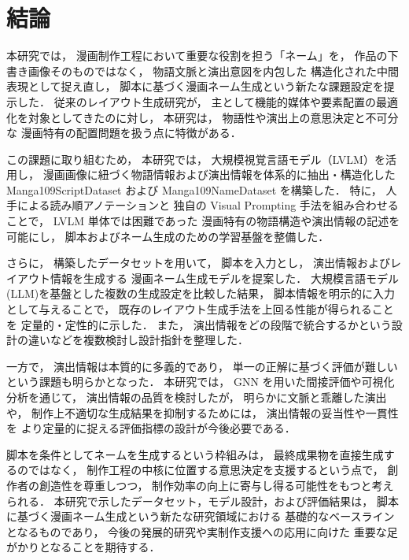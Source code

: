 \documentclass[a4j,12pt,dvipdfmx]{jsreport}
\begin{document}
\ifdefined\ismain\else
   \pagestyle{fancy}
   \lhead{\rightmark}
   \renewcommand{\chaptermark}[1]{\markboth{第\ \thechapter\ 章\ #1}{}}
   \setlength{\headheight}{16.5pt}
   \titleformat{\chapter}[hang]{\LARGE\bfseries}{\prechaptername\thechapter\postchaptername}{1em}{}
\fi

\chapter{結論}\label{chap:conclusion}

本研究では，
漫画制作工程において重要な役割を担う「ネーム」を，
作品の下書き画像そのものではなく，
物語文脈と演出意図を内包した
構造化された中間表現として捉え直し，
脚本に基づく漫画ネーム生成という新たな課題設定を提示した．
従来のレイアウト生成研究が，
主として機能的媒体や要素配置の最適化を対象としてきたのに対し，
本研究は，
物語性や演出上の意思決定と不可分な
漫画特有の配置問題を扱う点に特徴がある．

この課題に取り組むため，
本研究では，
大規模視覚言語モデル（LVLM）を活用し，
漫画画像に紐づく物語情報および演出情報を体系的に抽出・構造化した
Manga109ScriptDataset および Manga109NameDataset を構築した．
特に，
人手による読み順アノテーションと
独自の Visual Prompting 手法を組み合わせることで，
LVLM 単体では困難であった
漫画特有の物語構造や演出情報の記述を可能にし，
脚本およびネーム生成のための学習基盤を整備した．

さらに，
構築したデータセットを用いて，
脚本を入力とし，
演出情報およびレイアウト情報を生成する
漫画ネーム生成モデルを提案した．
大規模言語モデル(LLM)を基盤とした複数の生成設定を比較した結果，
脚本情報を明示的に入力として与えることで，
既存のレイアウト生成手法を上回る性能が得られることを
定量的・定性的に示した．
また，
演出情報をどの段階で統合するかという設計の違いなどを複数検討し設計指針を整理した．

一方で，
演出情報は本質的に多義的であり，
単一の正解に基づく評価が難しいという課題も明らかとなった．
本研究では，
GNN を用いた間接評価や可視化分析を通じて，
演出情報の品質を検討したが，
明らかに文脈と乖離した演出や，
制作上不適切な生成結果を抑制するためには，
演出情報の妥当性や一貫性を
より定量的に捉える評価指標の設計が今後必要である．

脚本を条件としてネームを生成するという枠組みは，
最終成果物を直接生成するのではなく，
制作工程の中核に位置する意思決定を支援するという点で，
創作者の創造性を尊重しつつ，
制作効率の向上に寄与し得る可能性をもつと考えられる．
本研究で示したデータセット，モデル設計，および評価結果は，
脚本に基づく漫画ネーム生成という新たな研究領域における
基礎的なベースラインとなるものであり，
今後の発展的研究や実制作支援への応用に向けた
重要な足がかりとなることを期待する．


\ifdefined\ismain\else
   \printbibliography[title=参考文献]
\fi
\end{document}
